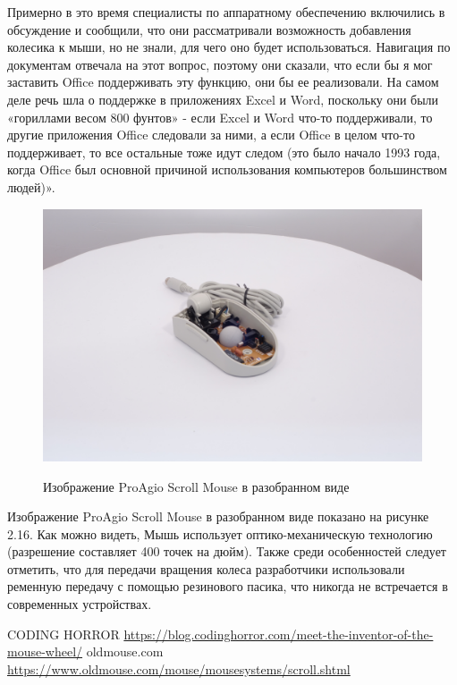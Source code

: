 \documentclass[11pt, a4paper]{article}
\begin{document}
    Примерно в это время специалисты по аппаратному обеспечению включились в обсуждение и сообщили, что они рассматривали возможность добавления колесика к мыши, но не знали, для чего оно будет использоваться. Навигация по документам отвечала на этот вопрос, поэтому они сказали, что если бы я мог заставить Office поддерживать эту функцию, они бы ее реализовали. На самом деле речь шла о поддержке в приложениях Excel и Word, поскольку они были «гориллами весом 800 фунтов» - если Excel и Word что-то поддерживали, то другие приложения Office следовали за ними, а если Office в целом что-то поддерживает, то все остальные тоже идут следом (это было начало 1993 года, когда Office был основной причиной использования компьютеров большинством людей)».

\begin{figure}[h]
        \centering
    \includegraphics[scale=0.4]{1995_pro_agio_scroll_mouse/6.3.jpg}
        \label{quad-kov}
        \caption{Изображение ProAgio Scroll Mouse в разобранном виде}
    \end{figure}

   Изображение ProAgio Scroll Mouse в разобранном виде показано на рисунке 2.16. Как можно видеть, Мышь использует оптико-механическую технологию (разрешение составляет 400 точек на дюйм). Также среди особенностей следует отметить, что для передачи вращения колеса разработчики использовали ременную передачу с помощью резинового пасика, что никогда не встречается в современных устройствах.
\begin{thebibliography}{9}
 CODING HORROR \url{https://blog.codinghorror.com/meet-the-inventor-of-the-mouse-wheel/}
 oldmouse.com \url{https://www.oldmouse.com/mouse/mousesystems/scroll.shtml}
\end{thebibliography}
\end{document}
